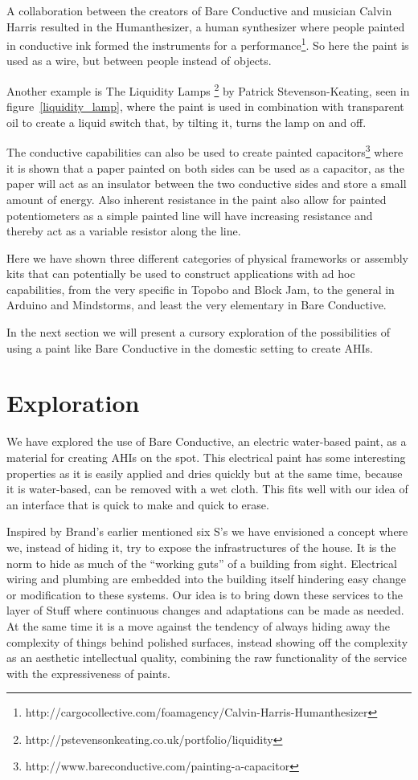 A collaboration between the creators of Bare Conductive and musician Calvin Harris resulted in the Humanthesizer, a human synthesizer where people painted in conductive ink formed the instruments for a performance\footnote{http://cargocollective.com/foamagency/Calvin-Harris-Humanthesizer}.
So here the paint is used as a wire, but between people instead of objects.

Another example is The Liquidity Lamps \footnote{http://pstevensonkeating.co.uk/portfolio/liquidity} by Patrick Stevenson-Keating, seen in figure~\ref{liquidity_lamp}, where the paint is used in combination with transparent oil to create a liquid switch that, by tilting it, turns the lamp on and off.

The conductive capabilities can also be used to create painted capacitors\footnote{http://www.bareconductive.com/painting-a-capacitor} where it is shown that a paper painted on both sides can be used as a capacitor, as the paper will act as an insulator between the two conductive sides and store a small amount of energy.
Also inherent resistance in the paint also allow for painted potentiometers as a simple painted line will have increasing resistance and thereby act as a variable resistor along the line.

Here we have shown three different categories of physical frameworks or assembly kits that can potentially be used to construct applications with ad hoc capabilities, from the very specific in Topobo and Block Jam, to the general in Arduino and Mindstorms, and least the very elementary in Bare Conductive.

In the next section we will present a cursory exploration of the possibilities of using a paint like Bare Conductive in the domestic setting to create AHIs.

\section{Exploration}
We have explored the use of Bare Conductive, an electric water-based paint, as a material for creating AHIs on the spot.
This electrical paint has some interesting properties as it is easily applied and dries quickly but at the same time, because it is water-based, can be removed with a wet cloth.
This fits well with our idea of an interface that is quick to make and quick to erase.

Inspired by Brand's earlier mentioned six S's \citep{brand1995buildings} we have envisioned a concept where we, instead of hiding it, try to expose the infrastructures of the house.
It is the norm to hide as much of the ``working guts'' of a building from sight.
Electrical wiring and plumbing are embedded into the building itself hindering easy change or modification to these systems.
Our idea is to bring down these services to the layer of Stuff where continuous changes and adaptations can be made as needed.
At the same time it is a move against the tendency of always hiding away the complexity of things behind polished surfaces, instead showing off the complexity as an aesthetic intellectual quality, combining the raw functionality of the service with the expressiveness of paints.

